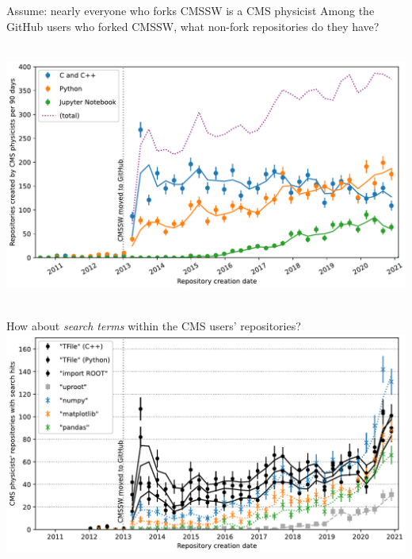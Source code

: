 \documentclass[aspectratio=169]{beamer}
\begin{document}
\begin{frame}{Assume: nearly everyone who forks CMSSW is a CMS physicist}
\vspace{0.25 cm}
Among the GitHub users who forked CMSSW, what non-fork repositories do they have?

\vspace{0.25 cm}
\mbox{ }\hfill\includegraphics[width=0.88\linewidth]{PLOTS/lhlhc-github-languages-paper.pdf}\hfill\mbox{ }
\end{frame}

\begin{frame}{How about {\it search terms} within the CMS users' repositories?}
\vspace{0.25 cm}
\includegraphics[width=\linewidth]{PLOTS/lhlhc-github-overlay-lin-paper.pdf}
\end{frame}
\end{document}
